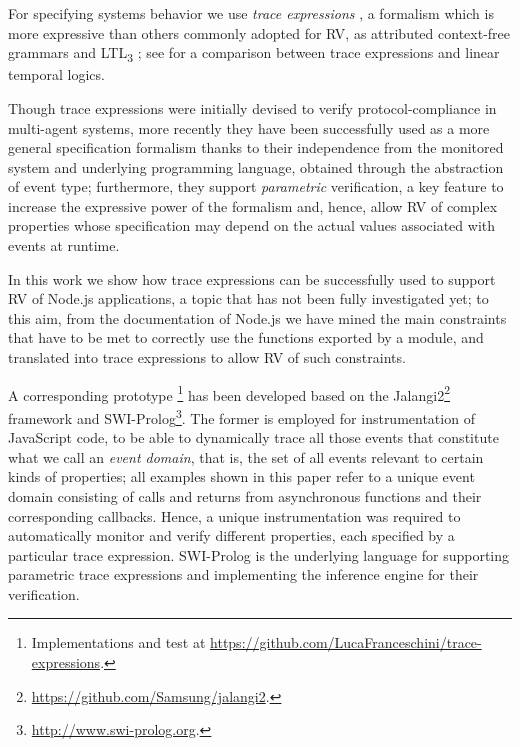 For specifying systems behavior we use \emph{trace expressions} \cite{ancona2016comparing}, a formalism which is more expressive than others
commonly adopted for RV, as
attributed context-free grammars \cite{de2014combining} and LTL\textsubscript{3} \cite{ltl3}; see \cite{AnconaFM16} for a comparison between trace expressions and linear temporal logics.

Though trace expressions were initially devised to verify protocol-compliance in multi-agent systems, more recently they have been successfully
used as a more general specification formalism \cite{ParametricJava17, TowardsIoT17} thanks to their independence from the monitored system and underlying programming language, obtained through the abstraction of event type;
furthermore, they support \emph{parametric} verification, a key feature to increase the expressive power of the formalism and, hence, allow RV of complex properties whose specification may depend on the actual values associated with events at runtime.

In this work we show how trace expressions can be successfully used to support RV of Node.js applications, a topic that has not
been fully investigated yet;  to this aim, from the documentation of Node.js we have mined the main constraints that have
to be met to correctly use the functions exported by a module, and translated into trace expressions to allow RV of
such constraints.

A corresponding prototype%
\footnote{Implementations and test at \url{https://github.com/LucaFranceschini/trace-expressions}.}
has been developed based on the Jalangi2\footnote{\url{https://github.com/Samsung/jalangi2}.}
framework and SWI-Prolog\footnote{\url{http://www.swi-prolog.org}.}.
The former is employed for instrumentation of JavaScript code, to be able
to dynamically trace all those events that constitute what we call an \emph{event domain}, that is, the set
of all events relevant to certain kinds of properties;
all examples shown in this paper refer to a unique event domain consisting of calls and returns
from asynchronous functions and their corresponding callbacks. Hence, a unique instrumentation
was required to automatically monitor and verify different properties, each specified by a particular trace expression.
SWI-Prolog is the underlying language for supporting parametric
trace expressions and implementing the inference engine for their verification.

